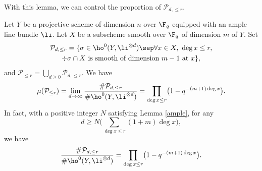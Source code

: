 With this lemma, we can control the proportion of $\mathcal{P}_{d,\leq r}$.

\begin{prop}\label{smallf}
Let $Y$ be a projective scheme of dimension $n$ over $\F_q$ equipped with an ample line bundle $\li$. Let $X$ be a subscheme smooth over $\F_q$ of dimension $m$ of $Y$. Set
\begin{multline*}
\mathcal{P}_{d,\leq r}=\{ \sigma\in \ho^0(Y,\li^{\otimes d})\sep \forall x\in X,\ \deg x\leq r,\\ \div \sigma\cap X \text{ is smooth of dimension } m-1 \text{ at }x \},
\end{multline*}
and $\mathcal{P}_{\leq r}=\bigcup_{d\geq 0}\mathcal{P}_{d,\leq r}$.
We have
\[
\mu(\mathcal{P}_{\leq r})=\lim_{d\to \infty} \frac{\#\mathcal{P}_{d,\leq r}}{\#\ho^0(Y, \li^{\otimes d})}=\prod_{\deg x\leq r} \bigl(1-q^{-(m+1)\deg x} \bigr).
\]
In fact, with a positive integer $N$ satisfying Lemma \ref{ample}, for any
\[
d\geq N\bigl(\sum_{\deg x\leq r}(1+ m)\deg x\bigr),
\]
we have
\[
\frac{\#\mathcal{P}_{d,\leq r}}{\#\ho^0(Y, \li^{\otimes d})}=\prod_{\deg x\leq r} \bigl(1-q^{-(m+1)\deg x} \bigr).
\]
\end{prop}
